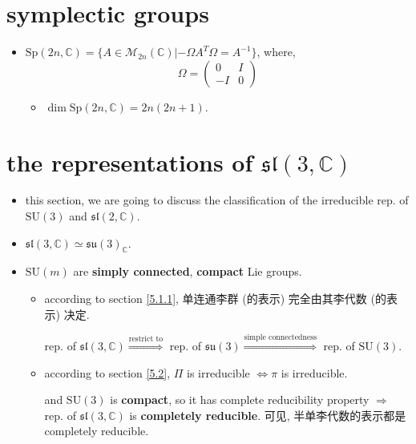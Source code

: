 \section{symplectic groups}
\begin{itemize}
	\item $\mathrm{Sp}(2 n, \mathbb{C}) = \{A \in \mathcal{M}_{2 n}(\mathbb{C}) | - \Omega A^T \Omega = A^{- 1}\}$, where,
	\begin{equation}
		\Omega = \begin{pmatrix}
			0 & I \\
			- I & 0
		\end{pmatrix}
	\end{equation}
	\begin{itemize}
		\item $\dim \mathrm{Sp}(2 n, \mathbb{C}) = 2 n (2 n + 1)$.
	\end{itemize}
\end{itemize}

\section{the representations of \texorpdfstring{$\mathfrak{sl}(3, \mathbb{C})$}{sl(3, C)}}
\begin{itemize}
	\item this section, we are going to discuss the classification of the irreducible rep. of $\mathrm{SU}(3)$ and $\mathfrak{sl}(2, \mathbb{C})$.
	
	\item $\mathfrak{sl}(3, \mathbb{C}) \simeq \mathfrak{su}(3)_\mathbb{C}$.
	
	\item $\mathrm{SU}(m)$ are \textbf{simply connected}, \textbf{compact} Lie groups.
	\begin{itemize}
		\item according to section \ref{5.1.1}, 单连通李群 (的表示) 完全由其李代数 (的表示) 决定.
		
		rep. of $\mathfrak{sl}(3, \mathbb{C}) \overset{\text{restrict to}}{\Longrightarrow}$ rep. of $\mathfrak{su}(3) \overset{\text{simple connectedness}}{\Longrightarrow}$ rep. of $\mathrm{SU}(3)$.
		
		\item according to section \ref{5.2}, $\Pi$ is irreducible $\iff \pi$ is irreducible.
		
		and $\mathrm{SU}(3)$ is \textbf{compact}, so it has complete reducibility property $\Longrightarrow$ rep. of $\mathfrak{sl}(3, \mathbb{C})$ is \textbf{completely reducible}. 可见, 半单李代数的表示都是 completely reducible.
	\end{itemize}
\end{itemize}
